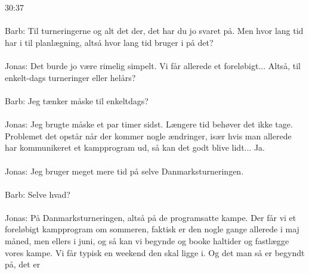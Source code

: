 \\\\
30:37
\\\\
Barb: Til turneringerne og alt det der, det har du jo svaret på. Men hvor lang tid har i til planlægning, altså hvor lang tid bruger i på det?
\\\\
Jonas: Det burde jo være rimelig simpelt. Vi får allerede et foreløbigt... Altså, til enkelt-dags turneringer eller helårs?
\\\\
Barb: Jeg tænker måske til enkeltdags? 
\\\\
Jonas: Jeg brugte måske et par timer sidst. Længere tid behøver det ikke tage. Problemet det opstår når der kommer nogle ændringer, især hvis man allerede har kommunikeret et kampprogram ud, så kan det godt blive lidt... Ja.
\\\\
Jonas: Jeg bruger meget mere tid på selve Danmarksturneringen.
\\\\
Barb: Selve hvad?
\\\\
Jonas: På Danmarksturneringen, altså på de programsatte kampe. Der får vi et foreløbigt kampprogram om sommeren, faktisk er den nogle gange allerede i maj måned, men ellers i juni, og så kan vi begynde og booke haltider og fastlægge vores kampe. Vi får typisk en weekend den skal ligge i. Og det man så er begyndt på, det er 